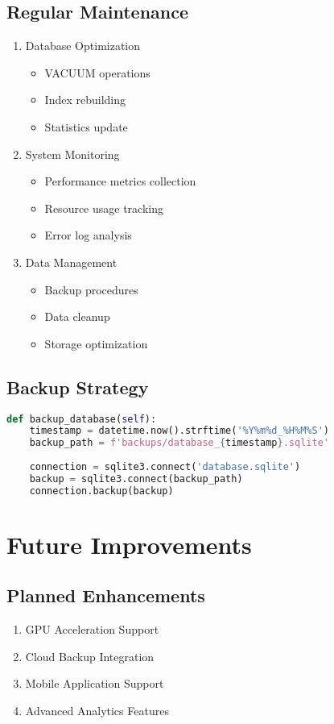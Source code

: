 \documentclass[11pt,a4paper]{report}
\begin{document}
\section{Regular Maintenance}
\begin{enumerate}
    \item Database Optimization
    \begin{itemize}
        \item VACUUM operations
        \item Index rebuilding
        \item Statistics update
    \end{itemize}
    
    \item System Monitoring
    \begin{itemize}
        \item Performance metrics collection
        \item Resource usage tracking
        \item Error log analysis
    \end{itemize}
    
    \item Data Management
    \begin{itemize}
        \item Backup procedures
        \item Data cleanup
        \item Storage optimization
    \end{itemize}
\end{enumerate}

\section{Backup Strategy}
\begin{lstlisting}[language=Python]
def backup_database(self):
    timestamp = datetime.now().strftime('%Y%m%d_%H%M%S')
    backup_path = f'backups/database_{timestamp}.sqlite'
    
    connection = sqlite3.connect('database.sqlite')
    backup = sqlite3.connect(backup_path)
    connection.backup(backup)
\end{lstlisting}

\chapter{Future Improvements}

\section{Planned Enhancements}
\begin{enumerate}
    \item GPU Acceleration Support
    \item Cloud Backup Integration
    \item Mobile Application Support
    \item Advanced Analytics Features
\end{enumerate}
\end{document}
